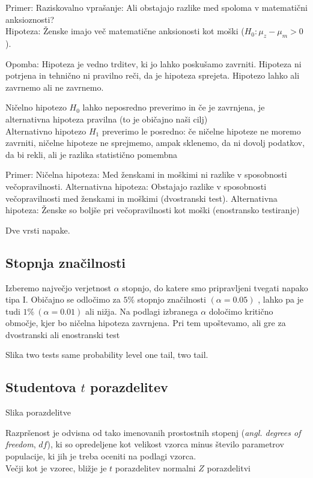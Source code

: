 Primer: Raziskovalno vprašanje: Ali obstajajo razlike med spoloma v matematični anksioznosti?\\
Hipoteza: Ženske imajo več matematične anksionosti kot moški ($H_0: \mu_z - \mu_m >0$).

Opomba: Hipoteza je vedno trditev, ki jo lahko poskušamo zavrniti. Hipoteza ni potrjena in tehnično ni pravilno reči, da je hipoteza sprejeta. Hipotezo lahko ali zavrnemo ali ne zavrnemo.

Ničelno hipotezo $H_0$ lahko neposredno preverimo in če je zavrnjena, je alternativna hipoteza pravilna (to je običajno naši cilj)\\
Alternativno hipotezo $H_1$ preverimo le posredno: če ničelne hipoteze ne moremo zavrniti, ničelne hipoteze ne sprejmemo, ampak sklenemo, da ni dovolj podatkov, da bi rekli, ali je razlika statistično pomembna

Primer: Ničelna hipoteza: Med ženskami in moškimi ni razlike v sposobnosti večopravilnosti. Alternativna hipoteza: Obstajajo razlike v sposobnosti večopravilnosti med ženskami in moškimi (dvostranski test). Alternativna hipoteza: Ženske so boljše pri večopravilnosti kot moški (enostransko testiranje)

Dve vrsti napake.

\subsection*{Stopnja značilnosti}

Izberemo največjo verjetnost $\alpha$ stopnjo, do katere smo pripravljeni tvegati napako tipa I. Običajno se odločimo za $5\%$ stopnjo značilnosti $(\alpha = 0.05)$ , lahko pa je tudi $1\%\  (\alpha = 0.01)$ ali nižja. Na podlagi izbranega $\alpha$ določimo kritično območje, kjer bo ničelna hipoteza zavrnjena. Pri tem upoštevamo, ali gre za dvostranski ali enostranski test

Slika two tests same probability level one tail, two tail.

\subsection*{Studentova $t$ porazdelitev}

Slika porazdelitve

Razpršenost je odvisna od tako imenovanih prostostnih stopenj (\textit{angl. degrees of freedom}, $df$), ki so opredeljene kot velikost vzorca minus število parametrov populacije, ki jih je treba oceniti na podlagi vzorca.\\
Večji kot je vzorec, bližje je $t$ porazdelitev normalni $Z$ porazdelitvi

